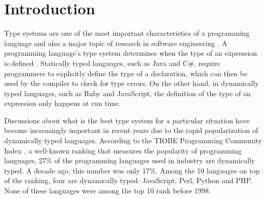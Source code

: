 \documentclass[msc]{ppgccufmg}
\begin{document}
\newcommand{\dummytxtc}{%
At vero eos et accusamus et iusto odio dignissimos ducimus qui blanditiis
praesentium voluptatum deleniti atque corrupti quos dolores et quas molestias
excepturi sint occaecati cupiditate non provident, similique sunt in culpa qui
officia deserunt mollitia animi, id est laborum et dolorum fuga. Et harum
quidem rerum facilis est et expedita distinctio. Nam libero tempore, cum soluta
nobis est eligendi optio cumque nihil impedit quo minus id quod maxime placeat
facere possimus, omnis voluptas assumenda est, omnis dolor
repellendus. Temporibus autem quibusdam et aut officiis debitis aut rerum
necessitatibus saepe eveniet ut et voluptates repudiandae sint et molestiae non
recusandae. Itaque earum rerum hic tenetur a sapiente delectus, ut aut
reiciendis voluptatibus maiores alias consequatur aut perferendis doloribus
asperiores repellat.\par
}

\newcommand{\dummytxt}{\dummytxta\dummytxtb\dummytxtc}

\chapter{Introduction}

Type systems are one of the most important characteristics of a programming language and also a major topic of research in software engineering \cite{Furr09,takikawa12,types_and_programming_languages,gradual_typing}.
A programming language's type system determines when the type of an expression is defined \cite{types_and_programming_languages}. 
Statically typed languages, such as Java and C\#, require programmers to explicitly define the type of a declaration, which can then be used by the compiler to check for type errors. 
On the other hand, in dynamically typed languages, such as Ruby and JavaScript, the definition of the type of an expression only happens at run time.

Discussions about what is the best type system for a particular situation have become increasingly important in recent years due to the rapid popularization of dynamically typed languages. 
According to the TIOBE Programming Community Index \cite{tiobe}, a well-known ranking that measures the popularity of programming languages, 27\% of the programming languages used in industry are dynamically typed. 
A decade ago, this number was only 17\%. 
Among the 10 languages on top of the ranking, four are dynamically typed: JavaScript, Perl, Python and PHP. 
None of these languages were among the top 10 rank before 1998.
\end{document}
